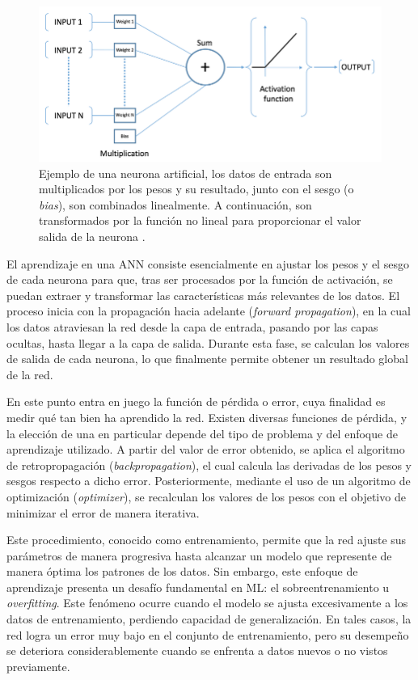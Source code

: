 \begin{figure}[h]
    \centering
    \includegraphics[width=\linewidth]{figures/2_theory/artificialNeuron.png}
    \caption[Ejemplo de una neurona artificial]{Ejemplo de una neurona artificial, los datos de entrada son multiplicados por los pesos y su resultado, junto con el sesgo (o \textit{bias}), son combinados linealmente. A continuación, son transformados por la función no lineal para proporcionar el valor salida de la neurona \cite{artificialNeuron}.}
    \label{fig:artificialNeuronExample}
\end{figure}

El aprendizaje en una ANN consiste esencialmente en ajustar los pesos y el sesgo de cada neurona para que, tras ser procesados por la función de activación, se puedan extraer y transformar las características más relevantes de los datos. El proceso inicia con la propagación hacia adelante (\textit{forward propagation}), en la cual los datos atraviesan la red desde la capa de entrada, pasando por las capas ocultas, hasta llegar a la capa de salida. Durante esta fase, se calculan los valores de salida de cada neurona, lo que finalmente permite obtener un resultado global de la red.

En este punto entra en juego la función de pérdida o error, cuya finalidad es medir qué tan bien ha aprendido la red. Existen diversas funciones de pérdida, y la elección de una en particular depende del tipo de problema y del enfoque de aprendizaje utilizado. A partir del valor de error obtenido, se aplica el algoritmo de retropropagación (\textit{backpropagation}), el cual calcula las derivadas de los pesos y sesgos respecto a dicho error. Posteriormente, mediante el uso de un algoritmo de optimización (\textit{optimizer}), se recalculan los valores de los pesos con el objetivo de minimizar el error de manera iterativa.

Este procedimiento, conocido como entrenamiento, permite que la red ajuste sus parámetros de manera progresiva hasta alcanzar un modelo que represente de manera óptima los patrones de los datos. Sin embargo, este enfoque de aprendizaje presenta un desafío fundamental en ML: el sobreentrenamiento u \textit{overfitting}. Este fenómeno ocurre cuando el modelo se ajusta excesivamente a los datos de entrenamiento, perdiendo capacidad de generalización. En tales casos, la red logra un error muy bajo en el conjunto de entrenamiento, pero su desempeño se deteriora considerablemente cuando se enfrenta a datos nuevos o no vistos previamente.


